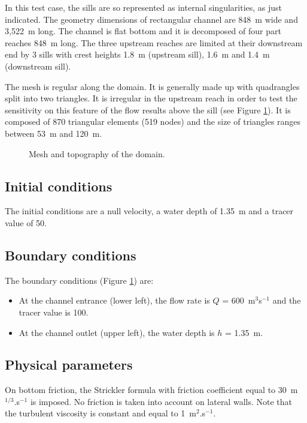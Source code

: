In this test case, the sills  are so represented as internal
singularities, as just indicated.
The geometry dimensions of rectangular channel are 848~m wide
and  3,522~m long. The channel is flat bottom and it is decomposed
of four part reaches 848~m long. The three upstream reaches are limited
at their downstream end by 3 sills with crest heights 1.8~m (upstream sill),
1.6~m and 1.4~m (downstream sill).

The mesh is regular along the domain. It is generally made up
with quadrangles split into two triangles. It is irregular in
the upstream reach in order to test the sensitivity on this
feature of the flow results above the sill (see Figure \ref{t2d:weirs:fig:geo}).
It is composed of 870 triangular elements (519 nodes) and
the size of triangles ranges between 53~m and 120~m.

\begin{figure}[!htbp]
 \centering
 \caption{Mesh and topography of the domain.}
 \label{t2d:weirs:fig:geo}
\end{figure}

\subsection{Initial conditions}

The initial conditions are a null velocity,
a water depth of 1.35~m and a tracer value of 50.

\subsection{Boundary conditions}

The boundary conditions (Figure \ref{t2d:weirs:fig:geo}) are:
\begin{itemize}
\item At the channel entrance (lower left), the flow rate is
$Q$ = 600~m$^3$s$^{-1}$ and the tracer value is 100.
\item At the channel outlet (upper left), the water depth is
$h$ = 1.35~m.
\end{itemize}

\subsection{Physical parameters}

On  bottom friction, the Strickler formula
with friction coefficient equal to
30~m$^{1/3}$.s$^{-1}$ is imposed.
No friction is taken into account on lateral walls.
Note that the turbulent viscosity is constant and equal to 1~m$^2$.s$^{-1}$.

